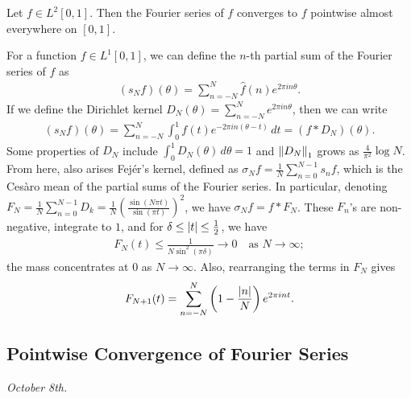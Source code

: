 \begin{theorem}
    Let $f \in L^{2}[0,1]$. Then the Fourier series of $f$ converges to $f$ pointwise almost everywhere on $[0,1]$.
\end{theorem}

For a function $f \in L^{1}[0,1]$, we can define the $n$-th partial sum of the Fourier series of $f$ as
\begin{align}
    (s_{N}f)(\theta) = \sum_{n=-N}^{N} \hat{f}(n) e^{2 \pi i n \theta}.
\end{align}
If we define the Dirichlet kernel $D_{N}(\theta) = \sum_{n=-N}^{N} e^{2 \pi i n \theta}$, then we can write
\begin{align}
    (s_{N}f)(\theta) = \sum_{n=-N}^{N} \int_{0}^{1} f(t) e^{-2 \pi i n (\theta-t)} \, dt = (f \ast D_{N})(\theta).
\end{align}
Some properties of $D_{N}$ include $\int_{0}^{1} D_{N}(\theta) \, d\theta = 1$ and $\left\lVert D_{N}\right\rVert_{1}$ grows as $\frac{4}{\pi^{2}} \log N$. From here, also arises Fej\'er's kernel, defined as $\sigma_{N}f = \frac{1}{N}\sum_{n=0}^{N-1} s_{n}f$, which is the Ces\`aro mean of the partial sums of the Fourier series. In particular, denoting $F_{N} = \frac{1}{N}\sum_{n=0}^{N-1} D_{k} = \frac{1}{N} \left( \frac{\sin(N\pi t)}{\sin(\pi t)} \right)^{2}$, we have $\sigma_{N}f = f \ast F_{N}$. These $F_{n}$'s are non-negative, integrate to $1$, and for $\delta \leq \left| t \right| \leq \frac{1}{2}$, we have
\begin{align}
    F_{N}(t) \leq \frac{1}{N \sin^{2}(\pi \delta)} \to 0 \quad \text{as } N \to \infty;
\end{align}
the mass concentrates at $0$ as $N \to \infty$. Also, rearranging the terms in $F_{N}$ gives
\begin{align}
    F_{N+1}(t) = \sum_{n=-N}^{N} \left(1 - \frac{\left| n \right|}{N}\right) e^{2 \pi i n t}.
\end{align}


\subsection{Pointwise Convergence of Fourier Series}
\noindent \textit{October 8th.}

